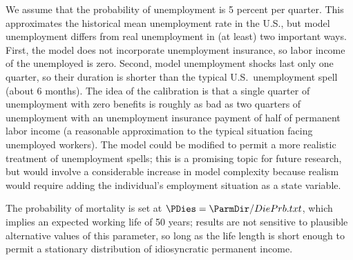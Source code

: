 We assume that the probability of unemployment is 5 percent per quarter.  This approximates the historical mean unemployment rate in the U.S., but model unemployment differs from real unemployment in (at least) two important ways.  First, the model does not incorporate unemployment insurance, so labor income of the unemployed is zero.  Second, model unemployment shocks last only one quarter, so their duration is shorter than the typical U.S.\ unemployment spell (about 6 months).  The idea of the calibration is that a single quarter of unemployment with zero benefits is roughly as bad as two quarters of unemployment with an unemployment insurance payment of half of permanent labor income (a reasonable approximation to the typical situation facing unemployed workers).  The model could be modified to permit a more realistic treatment of unemployment spells; this is a promising topic for future research, but would involve a considerable increase in model complexity because realism would require adding the individual's employment situation as a state variable.

The probability of mortality is set at $\PDies=  {\ParmDir/DiePrb.txt}$, which implies an expected working life of 50 years; results are not sensitive to plausible alternative values of this parameter, so long as the life length is short enough to permit a stationary distribution of idiosyncratic permanent income.
